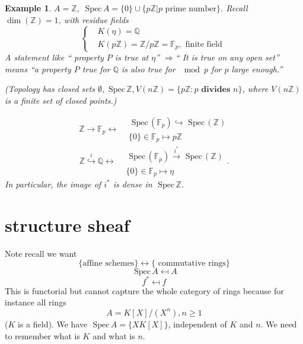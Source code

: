 \documentclass[11pt]{article}
\newtheorem{ex}[thm]{Example}
\newcommand{\spec}{\text{ Spec}\,}
\newcommand{\intg}{\mathbb Z}
\newcommand{\bbf}{\mathbb F}
\newcommand{\ratl}{\mathbb Q}
\newcommand{\Lrta}{\Longrightarrow}
\newcommand{\lrta}{\longrightarrow}
\newcommand{\llrta}{\longleftrightarrow}
\newcommand{\inj}{\hookrightarrow}
\begin{document}
\begin{ex}
$A=\intg$, $\spec A=\{0\}\cup \{p\intg|p\text{ prime number}\}$.
Recall $\dim (\intg)=1$, with residue fields 
$$
\left\{\begin{aligned}
&K(\eta)=\ratl\\
&K(p\intg)=\intg/p\intg=\bbf_p, \text{  finite field }
\end{aligned}\right.
$$
A statement like `` property  $P$ is true at $\eta$'' $\Lrta $`` It is true on any open set'' means ``a property $P$ true for $\ratl$ is also true for $\mod p$ for $p$ large enough.''

(Topology has closed sets $\emptyset, \spec \intg, V(n\intg)=\{p\intg: p\textbf{ divides }n\}$, where $V(n\intg)$ is a finite set of closed points.)

$$
\intg\lrta \bbf_p\llrta \begin{aligned}
&\spec (\bbf_p)\inj \spec (\intg)\\
& \{0\}\in\bbf_p\mapsto  p\intg
\end{aligned}
$$
$$
\intg\overset{i}{\inj} \ratl\llrta \begin{aligned}
&\spec (\bbf_p)\overset{i^*}{\lrta} \spec (\intg)\\
& \{0\}\in\bbf_p\mapsto  \eta
\end{aligned}.
$$
In particular, the image of $i^*$ is dense in $\spec \intg$.
\end{ex}
\section*{structure sheaf}

Note recall we want
$$
\{\text{affine schemes}\}\llrta \{\text{ commutative rings}\}
$$
$$
\spec A\mapsfrom A
$$
$$
f^*\mapsfrom f
$$
This is functorial but cannot capture the whole category of rings because for instance all rings
$$
A=K[X]/(X^n), n\geq 1
$$
($K$ is a field). We have $\spec A=\{XK[X]\}$, independent of $K$ and $n$. We need to remember what is $K$ and  what is $n$.
\end{document}
